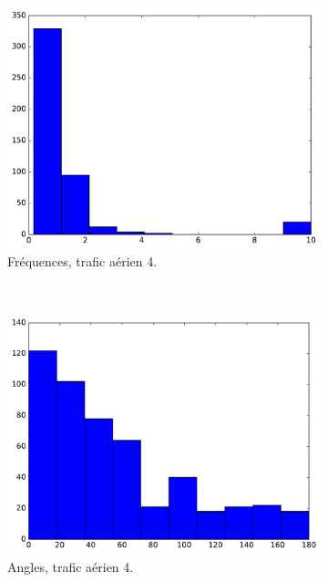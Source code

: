\begin{appendices}
\begin{figure}[htbp]
\begin{subfigure}[t]{\subImgWclicks}
			\includegraphics[width=\textwidth]{figures/ch3/flightradar2a_frequency}
			\caption{Fréquences, trafic aérien 4.}
			\label{fig:flightradar2a_frequency}
		\end{subfigure}
		~
		\begin{subfigure}[t]{\subImgWclicks}
			\centering
			\includegraphics[width=\textwidth]{figures/ch3/flightradar2a_angle}
			\caption{Angles, trafic aérien 4.}
			\label{fig:flightradar2a_angle}
		\end{subfigure}
		\caption[Histogrammes, contrôle du trafic aérien, bis]{}
		\label{fig:histAirControl34}
	\end{figure}
	


\end{appendices}
